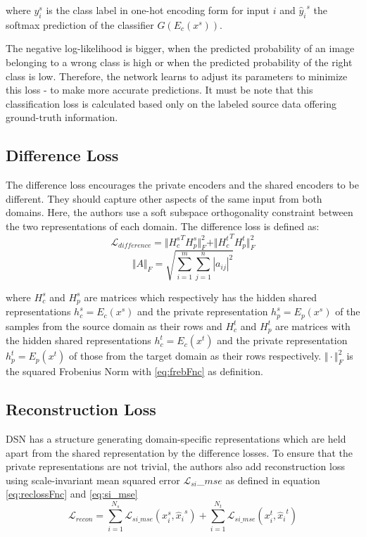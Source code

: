where  $y_i^s$ is the class label in one-hot encoding form for input $i$ and ${\hat{y}_i}^s$ the softmax prediction of the classifier $G\left(E_c(x^s)\right)$.

The negative log-likelihood is bigger, when the predicted probability of an image belonging to a wrong class is high or when the predicted probability of the right class is low. Therefore, the network learns to adjust its parameters to minimize this loss - to make more accurate predictions. It must be note that this classification loss is calculated based only on the labeled source data offering ground-truth information.

\subsection*{Difference Loss}
The difference loss encourages the private encoders and the shared encoders to be different. They should capture other aspects of the same input from both domains. Here, the authors use a soft subspace orthogonality constraint between the two representations of each domain. The difference loss is defined as:
	\begin{equation} \label{eq:difflossFnc}
			\mathcal{L}_{difference} = \Vert {H_c^s}^T{H_p^s}{\Vert_F^2} + \Vert {H_c^t}^T{H_p^t}{\Vert_F^2}
	\end{equation}
	\begin{equation} \label{eq:frebFnc}
			\Vert A {\Vert_F} = \sqrt{\overset{m}{\underset{i = 1}{\sum}}\overset{n}{\underset{j = 1}{\sum}}|a_{ij}|^2}
	\end{equation}

where ${H_c^s}$ and ${H_p^s}$ are matrices which respectively has the hidden shared representations $h_c^s = E_c(x^s)$ and the private representation $h_p^s = E_p(x^s)$ of the samples from the source domain as their rows and ${H_c^t}$ and ${H_p^t}$ are matrices with the hidden shared representations $h_c^t = E_c(x^t)$ and the private representation $h_p^t = E_p(x^t)$ of those from the target domain as their rows respectively. $\Vert \cdot {\Vert_F^2}$ is the squared Frobenius Norm with \eqref{eq:frebFnc} as definition.

\subsection*{Reconstruction Loss}
DSN has a structure generating domain-specific representations which are held apart from the shared representation by the difference losses. To ensure that the private representations are not trivial, the authors also add reconstruction loss using scale-invariant mean squared error $\mathcal{L}_{si}$\_${mse}$ as defined in equation \eqref{eq:reclossFnc} and \eqref{eq:si_mse}
	\begin{equation} \label{eq:reclossFnc}
			\mathcal{L}_{recon} = \overset{N_s}{\underset{i = 1}{\sum}}{\mathcal{L}}_{si\_{mse}}(x_i^s, {\hat{x}_i}^s) + \overset{N_t}{\underset{i = 1}{\sum}}{\mathcal{L}}_{si\_{mse}}(x_i^t, {\hat{x}_i}^t)
	\end{equation}		

